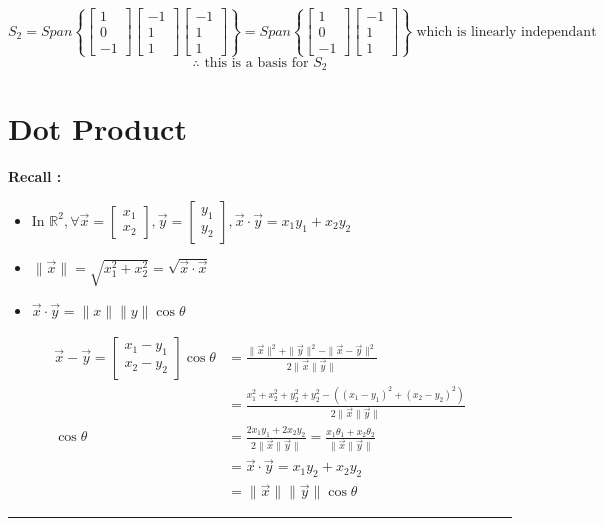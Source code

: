 \documentclass{article}
\newenvironment{proof}{{\bf Proof:}}{\hfill\rule{2mm}{2mm}}
\begin{document}
\[ S_2 = Span \left\{ \begin{bmatrix} 1 \\ 0 \\ -1 \end{bmatrix} \begin{bmatrix} -1 \\ 1 \\ 1 \end{bmatrix}  \begin{bmatrix} -1 \\ 1 \\ 1 \end{bmatrix} \right\} = Span \left\{ \begin{bmatrix} 1 \\ 0 \\ -1 \end{bmatrix} \begin{bmatrix} -1 \\ 1 \\ 1 \end{bmatrix} \right\} \text{ which is linearly independant}\]
$$ \therefore \text{ this is a basis for } S_2 $$ 

\section{Dot Product}
\textbf{Recall : } 
\begin{itemize}
\item In \( \mathbb{R}^2 , \forall \vec{x} = \begin{bmatrix} x_1 \\ x_2 \end{bmatrix} , \vec{y} = \begin{bmatrix} y_1 \\ y_2 \end{bmatrix} , \vec{x} \cdot \vec{y} = x_1y_1 + x_2y_2 \)
\item \( \| \vec{x} \| = \sqrt{x_1 ^2 + x_2 ^2}  =  \sqrt{\vec{x} \cdot \vec{x}}\)
\item \( \vec{x} \cdot \vec{y} = \| x \| \| y\| \cos \theta \)
\end{itemize}

\begin{proof}
\[ \begin{aligned} \vec{x} - \vec{y} = \begin{bmatrix} x_1 - y_1 \\ x_2- y_2\end{bmatrix} \cos \theta & =  \frac{\|\vec{x}\|^2 + \|\vec{y}\|^2 - \| \vec{x} - \vec{y}\| ^2}{2\|\vec{x}\| \vec{y}\|} \\
& = \frac{x_1^2 + x_2^2 + y_2^2 + y_2^2 - ( (x_1 - y_1) ^2 + (x_2 - y_2) ^2)}{2\|\vec{x}\| \vec{y}\|} \\ 
\cos \theta & = \frac{2x_1y_1 + 2x_2y_2}{2\|\vec{x}\| \vec{y}\|} = \frac{x_1\theta_1 + x_2\theta_2}{\|\vec{x}\| \vec{y}\|}  \\
& =  \vec{x}\cdot \vec{y}  = x_1y_2+x_2y_2 \\
& = \|\vec{x}\| \|\vec{y} \| \cos \theta \end{aligned} \]
\end{proof}
\end{document}
